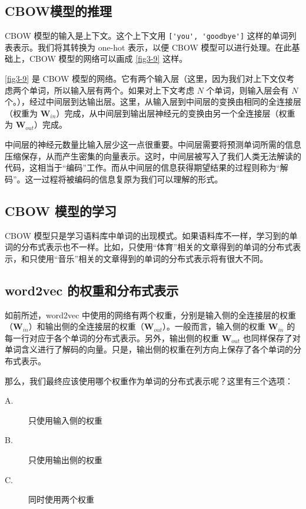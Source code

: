 \subsection{CBOW模型的推理}
CBOW 模型的输入是上下文。这个上下文用 \verb|['you', 'goodbye']| 这样的单词列表表示。我们将其转换为 one-hot 表示，以便 CBOW 模型可以进行处理。在此基础上，CBOW 模型的网络可以画成 \autoref{fig3-9} 这样。

\autoref{fig3-9} 是 CBOW 模型的网络。它有两个输入层（这里，因为我们对上下文仅考虑两个单词，所以输入层有两个。如果对上下文考虑 $N$ 个单词，则输入层会有 $N$ 个。），经过中间层到达输出层。这里，从输入层到中间层的变换由相同的全连接层（权重为 $\bm{W}_{in}$）完成，从中间层到输出层神经元的变换由另一个全连接层（权重为 $\bm{W}_{out}$）完成。


中间层的神经元数量比输入层少这一点很重要。中间层需要将预测单词所需的信息压缩保存，从而产生密集的向量表示。这时，中间层被写入了我们人类无法解读的代码，这相当于“编码”工作。而从中间层的信息获得期望结果的过程则称为“解码”。这一过程将被编码的信息复原为我们可以理解的形式。

\subsection{CBOW 模型的学习}
CBOW 模型只是学习语料库中单词的出现模式。如果语料库不一样，学习到的单词的分布式表示也不一样。比如，只使用“体育”相关的文章得到的单词的分布式表示，和只使用“音乐”相关的文章得到的单词的分布式表示将有很大不同。
\subsection{word2vec 的权重和分布式表示}
如前所述，word2vec 中使用的网络有两个权重，分别是输入侧的全连接层的权重（$\bm{W}_{in}$）和输出侧的全连接层的权重（$\bm{W}_{out}$）。一般而言，输入侧的权重 $\bm{W}_{in}$ 的每一行对应于各个单词的分布式表示。另外，输出侧的权重 $\bm{W}_{out}$ 也同样保存了对单词含义进行了解码的向量。只是，输出侧的权重在列方向上保存了各个单词的分布式表示。

那么，我们最终应该使用哪个权重作为单词的分布式表示呢？这里有三个选项：

\begin{description}
    \item[A.] 只使用输入侧的权重
    \item[B.] 只使用输出侧的权重
    \item[C.] 同时使用两个权重
\end{description}

